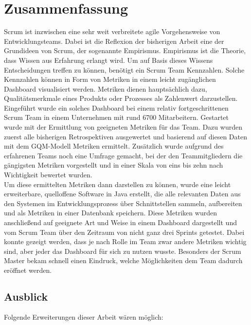 \chapter{Zusammenfassung}

Scrum ist inzwischen eine sehr weit verbreitete agile Vorgehensweise von Entwicklungsteams.
Dabei ist die Reflexion der bisherigen Arbeit eine der Grundideen von Scrum, der sogenannte Empirismus.
Empirismus ist die Theorie, dass Wissen aus Erfahrung erlangt wird.
Um auf Basis dieses Wissens Entscheidungen treffen zu können, benötigt ein Scrum Team Kennzahlen.
Solche Kennzahlen können in Form von Metriken in einem leicht zugänglichen Dashboard visualisiert werden.
Metriken dienen hauptsächlich dazu, Qualitätsmerkmale eines Produkts oder Prozesses als Zahlenwert darzustellen.
\\
Eingeführt wurde ein solches Dashboard bei einem relativ fortgeschrittenen Scrum Team in einem Unternehmen mit rund 6700 Mitarbeitern.
Gestartet wurde mit der Ermittlung von geeigneten Metriken für das Team.
Dazu wurden zuerst alle bisherigen Retrospektiven ausgewertet und basierend auf diesen Daten mit dem \ac{GQM}-Modell Metriken ermittelt.
Zusätzlich wurde aufgrund des erfahrenen Teams noch eine Umfrage gemacht, bei der den Teammitgliedern die gängigsten Metriken vorgestellt und in einer Skala von eins bis zehn nach Wichtigkeit bewertet wurden.
\\
Um diese ermittelten Metriken dann darstellen zu können, wurde eine leicht erweiterbare, quelloffene Software in Java erstellt, die alle relevanten Daten aus den Systemen im Entwicklungsprozess über Schnittstellen sammeln, aufbereiten und als Metriken in einer Datenbank speichern.
Diese Metriken wurden anschließend auf geeignete Art und Weise in einem Dashboard dargestellt und vom Scrum Team über den Zeitraum von nicht ganz drei Sprints getestet.
Dabei konnte gezeigt werden, dass je nach Rolle im Team zwar andere Metriken wichtig sind, aber jeder das Dashboard für sich zu nutzen wusste.
Besonders der Scrum Master bekam schnell einen Eindruck, welche Möglichkeiten dem Team dadurch eröffnet werden.

\section{Ausblick}

Folgende Erweiterungen dieser Arbeit wären möglich:


